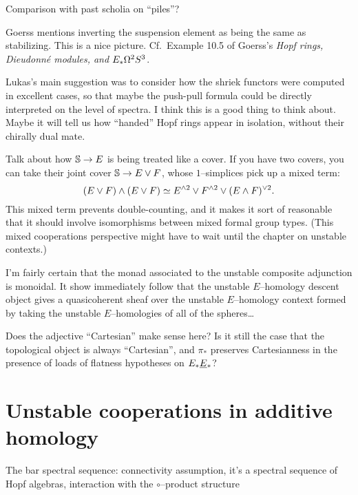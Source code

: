 Comparison with past scholia on ``piles''?


Goerss mentions inverting the suspension element as being the same as stabilizing. This is a nice picture. Cf.\ Example 10.5 of Goerss's \textit{Hopf rings, Dieudonn\'e modules, and $E_* \Loops^2 S^3$}.

Lukas's main suggestion was to consider how the shriek functors were computed in excellent cases, so that maybe the push-pull formula could be directly interpreted on the level of spectra.  I think this is a good thing to think about.  Maybe it will tell us how ``handed'' Hopf rings appear in isolation, without their chirally dual mate.

Talk about how $\S \to E$ is being treated like a cover. If you have two covers, you can take their joint cover $\S \to E \vee F$, whose $1$--simplices pick up a mixed term: \[(E \vee F) \sm (E \vee F) \simeq E^{\sm 2} \vee F^{\sm 2} \vee (E \sm F)^{\vee 2}.\]  This mixed term prevents double-counting, and it makes it sort of reasonable that it should involve isomorphisms between mixed formal group types.  (This mixed cooperations perspective might have to wait until the chapter on unstable contexts.)

I'm fairly certain that the monad associated to the unstable composite adjunction is monoidal.  It show immediately follow that the unstable $E$--homology descent object gives a quasicoherent sheaf over the unstable $E$--homology context formed by taking the unstable $E$--homologies of all of the spheres\ldots

Does the adjective ``Cartesian'' make sense here?  Is it still the case that the topological object is always ``Cartesian'', and $\pi_*$ preserves Cartesianness in the presence of loads of flatness hypotheses on $E_* \OS{E}{*}$?





\section{Unstable cooperations in additive homology}

The bar spectral sequence: connectivity assumption, it's a spectral sequence of Hopf algebras, interaction with the $\circ$--product structure

